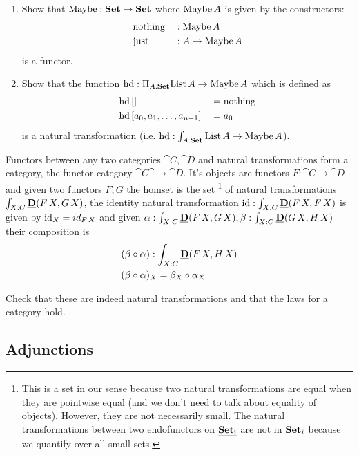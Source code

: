 \begin{Exercise}\hfill

  \begin{enumerate}
  \item 
    Show that $\mathrm{Maybe} : \mathbf{Set} \to \mathbf{Set}$ where $\mathrm{Maybe}\,A$ is given by the constructors:
    \begin{align*}
      &\mathrm{nothing} && : \mathrm{Maybe}\,A \\
      &\mathrm{just} && : A \to \mathrm{Maybe}\,A
    \end{align*}
   is a functor.
  \item Show that the function $\mathrm{hd} : \Pi_{A:\mathbf{Set}}\mathrm{List}\,A \to \mathrm{Maybe}\,A$ which is defined as
    \begin{align*}
      &\mathrm{hd}\,[] && = \mathrm{nothing} \\
      &\mathrm{hd}\,  [a_0,a_1,\dots,a_{n-1}]  && = a_0
    \end{align*}
    is a natural transformation (i.e. $\mathrm{hd} : \int_{A:\mathbf{Set}}\mathrm{List}\,A \to \mathrm{Maybe}\,A$).
  \end{enumerate}
\end{Exercise}

Functors between any two categories $\cat{C},\cat{D}$ and natural transformations form a category, the functor category $\cat{C}\cat{\to}\cat{D}$. It's objects are functors $F : \cat{C} \to \cat{D}$ and given two functors $F,G$ the homset is the set
\footnote{This is a set in our sense because two natural transformations are equal when they are pointwise equal (and we don't need to talk about equality of objects). However, they are not necessarily small. The natural transformations between two endofunctors on $\underline{\mathbf{\mathbf{Set}_i}}$ are not in $\mathbf{Set}_i$ because we quantify over all small sets.}
of natural transformations $\int_{X:C} \underline{\mathbf{D}}(F\,X,G\,X)$, the identity natural transformation $\mathrm{id} : \int_{X:C}\underline{\mathbf{D}}(F\,X,F\,X)$ is given by $\mathrm{id}_X = id_{F\,X}$ and given $\alpha : \int_{X:C} \underline{\mathbf{D}}(F\,X,G\,X), \beta : \int_{X:C}\underline{\mathbf{D}}(G\,X,H\,X)$ their composition is 
\begin{align*}
& (\beta \circ \alpha) : \int_{X:C} \underline{\mathbf{D}}(F\,X,H\,X)\\
& (\beta \circ \alpha)_X = \beta_X \circ \alpha_X
\end{align*}
\begin{Exercise}
  Check that these are indeed natural transformations and that the laws for a category hold.
\end{Exercise}

\subsection{Adjunctions}
\label{sec:adjunctions}

